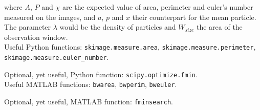 \documentclass{article}
\begin{document}
where $A$, $P$ and $\chi$ are the expected value of area, perimeter and euler's number measured on the images, and $a$, $p$ and $x$ their counterpart for the mean particle. The parameter $\lambda$ would be the density of particles and $W_{size}$ the area of the observation window.\\



Useful Python functions: \texttt{skimage.measure.area}, \texttt{skimage.measure.perimeter}, \texttt{skimage.measure.euler\_number}.

Optional, yet useful, Python function: \texttt{scipy.optimize.fmin}.\\

Useful MATLAB functions: \texttt{bwarea}, \texttt{bwperim}, \texttt{bweuler}.

Optional, yet useful, MATLAB function: \texttt{fminsearch}.
\end{document}
